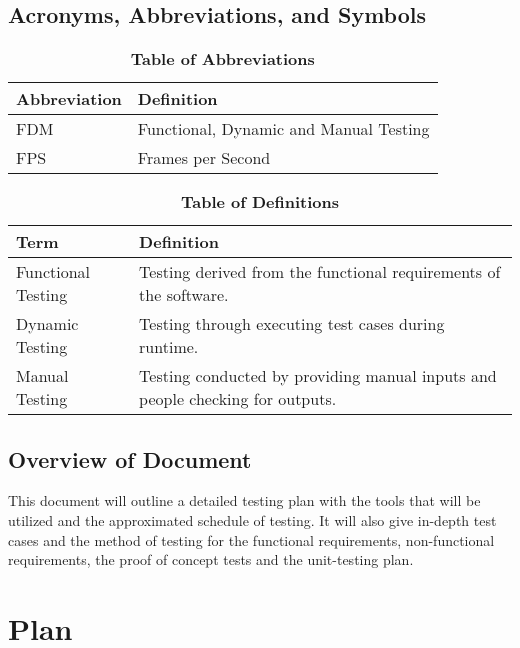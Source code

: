 \documentclass[12pt, titlepage]{article}
\begin{document}
\subsection{Acronyms, Abbreviations, and Symbols}
	
\begin{table}[hbp]
\caption{\textbf{Table of Abbreviations}} \label{Abbrev}

\begin{tabularx}{\textwidth}{p{3cm}X}
\toprule
\textbf{Abbreviation} & \textbf{Definition} \\
\midrule
FDM & Functional, Dynamic and Manual Testing\\
FPS & Frames per Second\\
\bottomrule
\end{tabularx}

\end{table}

\begin{table}[!htbp]
\caption{\textbf{Table of Definitions}} \label{Defs}

\begin{tabularx}{\textwidth}{p{3cm}X}
\toprule
\textbf{Term} & \textbf{Definition}\\
\midrule
Functional Testing & Testing derived from the functional requirements of the software.\\
Dynamic Testing & Testing through executing test cases during runtime.\\
Manual Testing & Testing conducted by providing manual inputs and people checking for outputs.\\
\bottomrule
\end{tabularx}

\end{table}	

\subsection{Overview of Document}

This document will outline a detailed testing plan with the tools that will be utilized and the approximated schedule of testing. It will also give in-depth test cases and the method of testing for the functional requirements, non-functional requirements, the proof of concept tests and the unit-testing plan.

\section{Plan}
	
\end{document}

